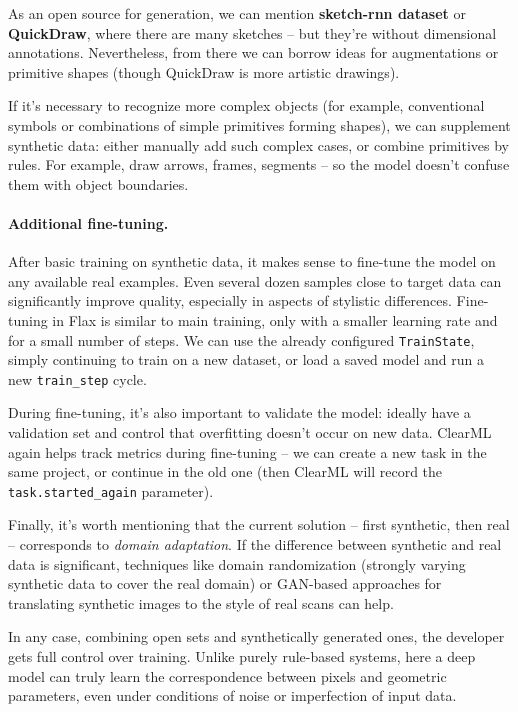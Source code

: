 \documentclass{article}
\begin{document}
As an open source for generation, we can mention \textbf{sketch-rnn dataset} or \textbf{QuickDraw}, where there are many sketches – but they're without dimensional annotations. Nevertheless, from there we can borrow ideas for augmentations or primitive shapes (though QuickDraw is more artistic drawings).

If it's necessary to recognize more complex objects (for example, conventional symbols or combinations of simple primitives forming shapes), we can supplement synthetic data: either manually add such complex cases, or combine primitives by rules. For example, draw arrows, frames, segments – so the model doesn't confuse them with object boundaries.

\paragraph{Additional fine-tuning.} 
After basic training on synthetic data, it makes sense to fine-tune the model on any available real examples. Even several dozen samples close to target data can significantly improve quality, especially in aspects of stylistic differences. Fine-tuning in Flax is similar to main training, only with a smaller learning rate and for a small number of steps. We can use the already configured \texttt{TrainState}, simply continuing to train on a new dataset, or load a saved model and run a new \texttt{train_step} cycle.

During fine-tuning, it's also important to validate the model: ideally have a validation set and control that overfitting doesn't occur on new data. ClearML again helps track metrics during fine-tuning – we can create a new task in the same project, or continue in the old one (then ClearML will record the \texttt{task.started_again} parameter).

Finally, it's worth mentioning that the current solution – first synthetic, then real – corresponds to \textit{domain adaptation}. If the difference between synthetic and real data is significant, techniques like domain randomization (strongly varying synthetic data to cover the real domain) or GAN-based approaches for translating synthetic images to the style of real scans can help.

In any case, combining open sets and synthetically generated ones, the developer gets full control over training. Unlike purely rule-based systems, here a deep model can truly learn the correspondence between pixels and geometric parameters, even under conditions of noise or imperfection of input data.
\end{document}
